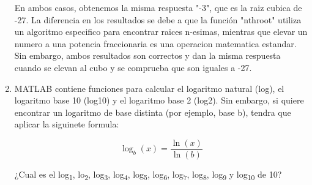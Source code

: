\documentclass{article}
\begin{document}
\begin{enumerate}
    En ambos casos, obtenemos la misma respuesta "-3", que es la raiz cubica de -27. La diferencia en los resultados se debe a que la función "nthroot" utiliza un algoritmo especifico para encontrar raices n-esimas, mientras que elevar un numero a una potencia fraccionaria es una operacion matematica estandar. Sin embargo, ambos resultados son correctos y dan la misma respuesta cuando se elevan al cubo y se comprueba que son iguales a -27.

    \newpage
    \item 

    MATLAB contiene funciones para calcular el logaritmo natural (log), el logaritmo base 10 (log10) y el logaritmo base 2 (log2). Sin embargo, si quiere encontrar un logaritmo de base distinta (por ejemplo, base b), tendra que aplicar la siguinete formula:
    
    \centering 
    \begin{equation*}
        \log_{b}(x) = \frac{\ln(x)}{\ln(b)}
    \end{equation*}

    
    ¿Cual es el log\textsubscript{1}, lo\textsubscript{2}, log\textsubscript{3}, log\textsubscript{4}, log\textsubscript{5}, log\textsubscript{6}, log\textsubscript{7}, log\textsubscript{8}, log\textsubscript{9} y log\textsubscript{10} de 10?
    

\end{enumerate}
\end{document}
